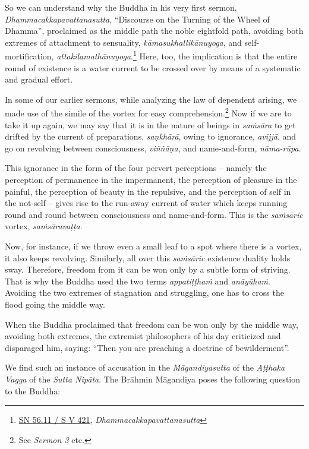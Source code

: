 So we can understand why the Buddha in his very first sermon, \emph{Dhammacakkapavattanasutta}, ``Discourse on the Turning of the Wheel of Dhamma'', proclaimed as the middle path the noble eightfold path, avoiding both extremes of attachment to sensuality, \emph{kāmasukhallikānuyoga}, and self-mortification, \emph{attakilamathānuyoga}.\footnote{\href{https://suttacentral.net/sn56.11/pli/ms}{SN 56.11 / S V 421}, \emph{Dhammacakkapavattanasutta}} Here, too, the implication is that the entire round of existence is a water current to be crossed over by means of a systematic and gradual effort.

In some of our earlier sermons, while analyzing the law of dependent arising, we made use of the simile of the vortex for easy comprehension.\footnote{See \emph{Sermon 3} etc.} Now if we are to take it up again, we may say that it is in the nature of beings in \emph{saṁsāra} to get drifted by the current of preparations, \emph{saṇkhārā}, owing to ignorance, \emph{avijjā}, and go on revolving between consciousness, \emph{viññāṇa}, and name-and-form, \emph{nāma-rūpa}.

This ignorance in the form of the four pervert perceptions -- namely the perception of permanence in the impermanent, the perception of pleasure in the painful, the perception of beauty in the repulsive, and the perception of self in the not-self -- gives rise to the run-away current of water which keeps running round and round between consciousness and name-and-form. This is the \emph{saṁsāric} vortex, \emph{saṁsāravaṭṭa}.

Now, for instance, if we throw even a small leaf to a spot where there is a vortex, it also keeps revolving. Similarly, all over this \emph{saṁsāric} existence duality holds sway. Therefore, freedom from it can be won only by a subtle form of striving. That is why the Buddha used the two terms \emph{appatiṭṭhaṁ} and \emph{anāyūhaṁ}. Avoiding the two extremes of stagnation and struggling, one has to cross the flood going the middle way.

When the Buddha proclaimed that freedom can be won only by the middle way, avoiding both extremes, the extremist philosophers of his day criticized and disparaged him, saying: ``Then you are preaching a doctrine of bewilderment''.

We find such an instance of accusation in the \emph{Māgandiyasutta} of the \emph{Aṭṭhaka Vagga} of the \emph{Sutta Nipāta}. The Brāhmin Māgandiya poses the following question to the Buddha:

